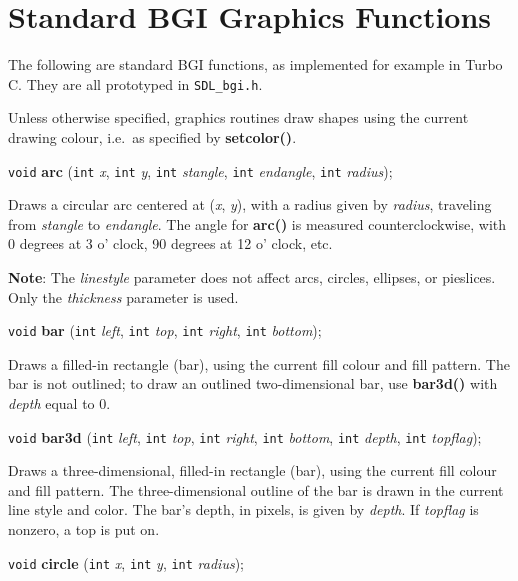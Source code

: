 \documentclass[a4paper,11pt]{article}
\newcommand{\V}{\texttt{void}}      %
\newcommand{\I}{\texttt{int}}       %
\newcommand{\func}[1]{\textbf{#1}}  %
\newcommand{\A}[1]{\emph{#1}}       %
\newcommand{\F}[1]{\texttt{#1}}     %
\newenvironment{bgi}
{ %
  \begin{snugshade}
}
{ %
  \end{snugshade}
}
\begin{document}

\section{Standard BGI Graphics Functions}

The following are standard BGI functions, as implemented for example
in Turbo C. They are all prototyped in \F{SDL\_bgi.h}.

Unless otherwise specified, graphics routines draw shapes using the
current drawing colour, i.e.\ as specified by \func{setcolor()}.


\begin{bgi}
  \V{} \func{arc} (\I{} \A{x}, \I{} \A{y}, \I{} \A{stangle}, \I{}
  \A{endangle}, \I{} \A{radius});
\end{bgi}

Draws a circular arc centered at (\A{x}, \A{y}), with a radius given
by \A{radius}, traveling from \A{stangle} to \A{endangle}. The angle
for \func{arc()} is measured counterclockwise, with 0 degrees at 3 o'
clock, 90 degrees at 12 o' clock, etc.

\textbf{Note}: The \A{linestyle} parameter does not affect arcs,
circles, ellipses, or pie\-slices. Only the \A{thickness} parameter is
used.


\begin{bgi}
\V{} \func{bar} (\I{} \A{left}, \I{} \A{top}, \I{} \A{right}, \I{}
\A{bottom});
\end{bgi}

Draws a filled-in rectangle (bar), using the current fill colour and
fill pattern. The bar is not outlined; to draw an outlined
two-dimensional bar, use \func{bar3d()} with \A{depth} equal to 0.


\begin{bgi}
\V{} \func{bar3d} (\I{} \A{left}, \I{} \A{top}, \I{} \A{right}, \I{}
\A{bottom}, \I{} \A{depth}, \I{} \A{topflag});
\end{bgi}

Draws a three-dimensional, filled-in rectangle (bar), using the
current fill colour and fill pattern. The three-dimensional outline of
the bar is drawn in the current line style and color. The bar's depth,
in pixels, is given by \A{depth}. If \A{topflag} is nonzero, a top is
put on.


\begin{bgi}
\V{} \func{circle} (\I{} \A{x}, \I{} \A{y}, \I{} \A{radius});
\end{bgi}
\end{document}
